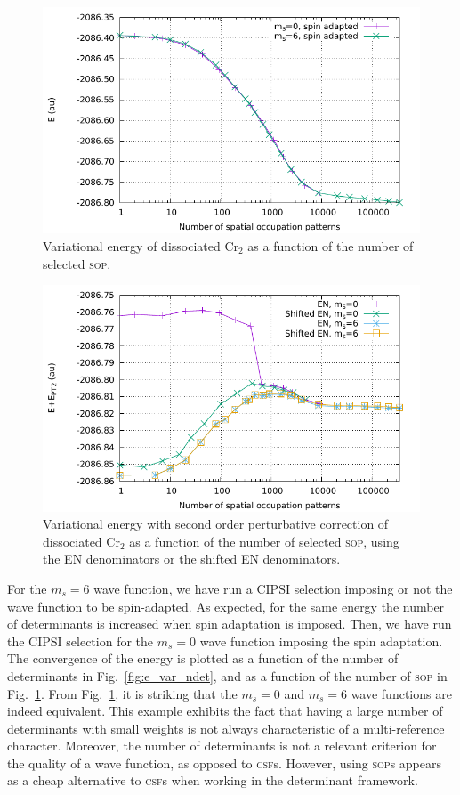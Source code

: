 \documentclass[aip,jcp,reprint,showkeys]{revtex4-1}
\newcommand{\sop}{\textsc{sop}}
\newcommand{\csf}{\textsc{csf}}
\begin{document}
\begin{figure}
\includegraphics[width=0.9\columnwidth]{e_var_nsop}
\caption{Variational energy of dissociated Cr$_2$ as a function of the number of
selected \sop{}.}
\label{fig:e_var_nsop}
\end{figure}

\begin{figure}
\includegraphics[width=0.9\columnwidth]{e_pt2_nsop}
\caption{Variational energy with second order perturbative correction of
dissociated Cr$_2$ as a function of the number of selected \sop{}, using
the EN denominators or the shifted EN denominators.}
\label{fig:e_pt2_nsop}
\end{figure}

For the $m_s=6$ wave function, we have run a CIPSI selection imposing or not the
wave function to be spin-adapted. As expected, for the same energy the number of
determinants is increased when spin adaptation is imposed. Then, we have run the
CIPSI selection for the $m_s=0$ wave function imposing the
spin adaptation. The convergence of the energy is plotted as a function of the
number of determinants in Fig.~\ref{fig:e_var_ndet}, and as a function of
the number of \sop{} in Fig.~\ref{fig:e_var_nsop}.
From Fig.~\ref{fig:e_var_nsop}, it is striking that the $m_s=0$ and $m_s=6$
wave functions are indeed equivalent.
This example exhibits the fact that having a large number of determinants with
small weights is not always characteristic of a multi-reference character.
Moreover, the number of determinants is not a relevant criterion for the
quality of a wave function, as opposed to \csf s. However, using \sop s
appears as a cheap alternative to \csf s when working in the determinant
framework.
\end{document}

